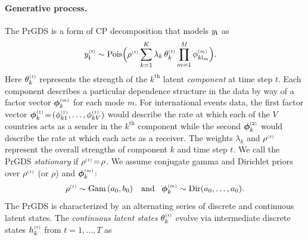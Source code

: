 \documentclass{article}
\begin{document}
\paragraph{Generative process.} The PrGDS is a form of CP decomposition \cite{harshman1970foundations} that models $y_{\textbf{\textrm{i}}}$ as
\begin{align}
\label{eq:tensor_likelihood}
\ydt &\sim \textrm{Pois}\Big(\rhot \sum_{k = 1}^K \lambda_k \, \thetakt \prod_{m=1}^M \phi^{\mathsmaller{(m)}}_{k \osub_m}\Big).
\end{align}
Here $\thetakt$ represents the strength of the $k^{\textrm{th}}$ latent \emph{component} at time step $t$. Each component describes a particular dependence structure in the data by way of a factor vector $\boldsymbol{\phi}^{\mathsmaller{(m)}}_{k}$ for each mode $m$. For international events data, the first factor vector $\boldsymbol{\phi}^{\mathsmaller{(1)}}_{k} \teq (\phi^{\mathsmaller{(1)}}_{k1},\dots,\phi^{\mathsmaller{(1)}}_{kV})$ would describe the rate at which each of the $V$ countries acts as a sender in the $k^{\textrm{th}}$ component while the second $\boldsymbol{\phi}^{\mathsmaller{(2)}}_{k}$ would describe the rate at which each acts as a receiver. The weights $\lambda_k$ and $\rho^{\mathsmaller{(t)}}$ represent the overall strengths of component $k$ and time step $t$. We call the PrGDS \emph{stationary} if $\rhot \teq \rho$. We assume conjugate gamma and Dirichlet priors over $\rho^{\mathsmaller{(t)}}$ (or $\rho$) and $\boldsymbol{\phi}^{\mathsmaller{(m)}}_{k}$:~
\begin{equation}
\rhot \sim \Gam{a_0, b_0} \,\,\,\textrm{ and }\,\,\, \boldsymbol{\phi}^{\mathsmaller{(m)}}_k \sim \textrm{Dir}(a_0,\dots,a_0).
\end{equation}
The PrGDS is characterized by an alternating series of discrete and continuous latent states. The \emph{continuous latent states} $\thetakt$ evolve via intermediate discrete states $\hkt$ from $t=1,\dots,T$ as~
\end{document}
